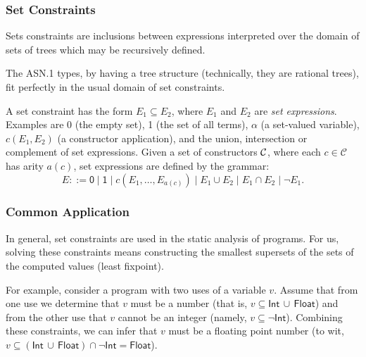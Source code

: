 \documentclass[compress,dvips,xcolor={dvipsnames},t]{beamer}
\newcommand\ASN{\textsf{ASN.1}\xspace}
\begin{document}
\begin{frame}
\frametitle{Set Constraints}

Sets constraints are inclusions between expressions interpreted over
the domain of sets of trees which may be recursively defined.

\medskip

The \ASN types, by having a tree structure (technically, they are
rational trees), fit perfectly in the usual domain of set
constraints.

\medskip

A set constraint has the form $E_1 \subseteq E_2$, where $E_1$ and
$E_2$ are \emph{set expressions}. Examples are \textsf{0} (the empty
set), \textsf{1} (the set of all terms), $\alpha$ (a set-valued
variable), $c(E_1, E_2)$ (a constructor application), and the union,
intersection or complement of set expressions. Given a set of
constructors ${\cal C}$, where each $c \in \mathcal{C}$ has arity
$a(c)$, set expressions are defined by the grammar:
\begin{equation*}
E ::= \textsf{0} \mid \textsf{1} \mid c (E_1, \ldots,
E_{a(c)}) \mid E_1 \cup E_2 \mid E_1 \cap E_2 \mid \neg E_1.
\end{equation*}

\end{frame}


\begin{frame}
\frametitle{Common Application}

In general, set constraints are used in the static analysis of
programs. For us, solving these constraints means constructing the
smallest supersets of the sets of the computed values (least
fixpoint).

\medskip

For example, consider a program with two uses of a variable
$v$. Assume that from one use we determine that $v$ must be a number
(that is, $v \subseteq \textsf{Int} \, \cup \, \textsf{Float}$) and
from the other use that $v$ cannot be an integer (namely, $v \subseteq
\neg\textsf{Int}$). Combining these constraints, we can infer that $v$
must be a floating point number (to wit, $v \subseteq (\textsf{Int} \,
\cup \, \textsf{Float}) \cap \neg\textsf{Int} = \textsf{Float}$).

\end{frame}

\end{document}
